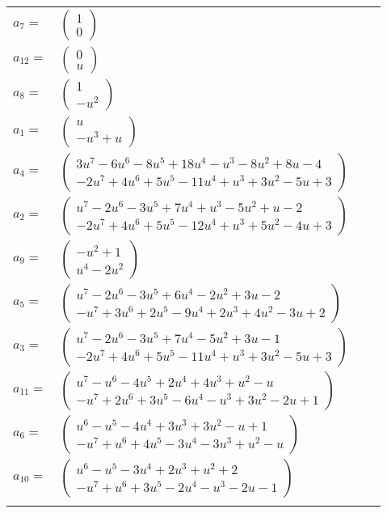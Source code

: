 \documentclass[1p]{elsarticle_modified}
\theoremstyle{definition}
\begin{document}
\begin{tabular}{m{7pt} m{180pt} m{7pt} m{180pt} }
\flushright $a_{7}=$&$\begin{pmatrix}1\\0\end{pmatrix}$ \\
\flushright $a_{12}=$&$\begin{pmatrix}0\\u\end{pmatrix}$ \\
\flushright $a_{8}=$&$\begin{pmatrix}1\\- u^2\end{pmatrix}$ \\
\flushright $a_{1}=$&$\begin{pmatrix}u\\- u^3+u\end{pmatrix}$ \\
\flushright $a_{4}=$&$\begin{pmatrix}3 u^7-6 u^6-8 u^5+18 u^4- u^3-8 u^2+8 u-4\\-2 u^7+4 u^6+5 u^5-11 u^4+u^3+3 u^2-5 u+3\end{pmatrix}$ \\
\flushright $a_{2}=$&$\begin{pmatrix}u^7-2 u^6-3 u^5+7 u^4+u^3-5 u^2+u-2\\-2 u^7+4 u^6+5 u^5-12 u^4+u^3+5 u^2-4 u+3\end{pmatrix}$ \\
\flushright $a_{9}=$&$\begin{pmatrix}- u^2+1\\u^4-2 u^2\end{pmatrix}$ \\
\flushright $a_{5}=$&$\begin{pmatrix}u^7-2 u^6-3 u^5+6 u^4-2 u^2+3 u-2\\- u^7+3 u^6+2 u^5-9 u^4+2 u^3+4 u^2-3 u+2\end{pmatrix}$ \\
\flushright $a_{3}=$&$\begin{pmatrix}u^7-2 u^6-3 u^5+7 u^4-5 u^2+3 u-1\\-2 u^7+4 u^6+5 u^5-11 u^4+u^3+3 u^2-5 u+3\end{pmatrix}$ \\
\flushright $a_{11}=$&$\begin{pmatrix}u^7- u^6-4 u^5+2 u^4+4 u^3+u^2- u\\- u^7+2 u^6+3 u^5-6 u^4- u^3+3 u^2-2 u+1\end{pmatrix}$ \\
\flushright $a_{6}=$&$\begin{pmatrix}u^6- u^5-4 u^4+3 u^3+3 u^2- u+1\\- u^7+u^6+4 u^5-3 u^4-3 u^3+u^2- u\end{pmatrix}$ \\
\flushright $a_{10}=$&$\begin{pmatrix}u^6- u^5-3 u^4+2 u^3+u^2+2\\- u^7+u^6+3 u^5-2 u^4- u^3-2 u-1\end{pmatrix}$\\&\end{tabular}
\end{document}
